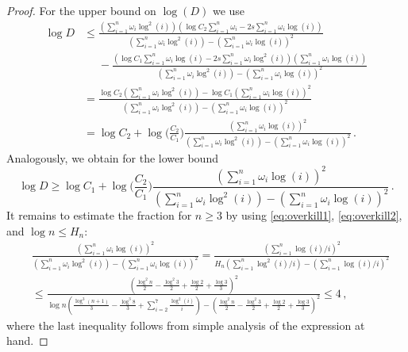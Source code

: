 \documentclass[10pt,a4paper]{amsart}
\begin{document}
\begin{proof}
    For the upper bound on $\log(D)$ we use
    \begin{align*}
        \log D
        &\le \frac{(\sum_{i=1}^{n}\omega_i \log^2 (i))(\log C_2 \sum_{i=1}^{n}\omega_i-2s\sum_{i=1}^{n}\omega_i\log (i))}{(\sum_{i=1}^{n}\omega_i\log^2 (i))-(\sum_{i=1}^{n}\omega_i \log (i))^2} \\
        &\phantom\le - \frac{(\log C_1\sum_{i=1}^{n}\omega_i\log (i) - 2s\sum_{i=1}^{n}\omega_i\log^2 (i))(\sum_{i=1}^{n}\omega_i\log (i))}{(\sum_{i=1}^{n}\omega_i\log^2 (i))-(\sum_{i=1}^{n}\omega_i \log (i))^2} \\
        &= \frac{\log C_2 (\sum_{i=1}^{n}\omega_i\log^2 (i)) - \log C_1 (\sum_{i=1}^{n}\omega_i\log (i))^2}{(\sum_{i=1}^{n}\omega_i\log^2 (i))-(\sum_{i=1}^{n}\omega_i \log (i))^2} \\
        &= \log C_2 + \log\Big(\frac{C_2}{C_1}\Big) \frac{(\sum_{i=1}^{n}\omega_i \log (i))^2}{(\sum_{i=1}^{n}\omega_i\log^2 (i))-(\sum_{i=1}^{n}\omega_i \log (i))^2} \,.
    \end{align*}
    Analogously, we obtain for the lower bound
    \begin{equation*}
        \log D
        \ge
        \log C_1 + \log\Big(\frac{C_2}{C_1}\Big) \frac{(\sum_{i=1}^{n}\omega_i \log (i))^2}{(\sum_{i=1}^{n}\omega_i\log^2 (i))-(\sum_{i=1}^{n}\omega_i \log (i))^2} \,.
    \end{equation*}
    It remains to estimate the fraction for $n\ge 3$ by using \eqref{eq:overkill1}, \eqref{eq:overkill2}, and $\log n\le H_n$:
    \begin{align*}
        &\frac{(\sum_{i=1}^{n}\omega_i \log(i))^2}{(\sum_{i=1}^{n}\omega_i \log^2(i)) - (\sum_{i=1}^{n}\omega_i \log(i))^2}
        = \frac{(\sum_{i=1}^{n}\log(i)/i)^2}{H_n(\sum_{i=1}^{n} \log^2(i)/i) - (\sum_{i=1}^{n} \log(i)/i)^2} \\
        &\le \frac{(\frac{\log^2 n}{2} - \frac{\log^2 3}{2} + \frac{\log 2}{2} + \frac{\log 3}{3})^2}{\log n(\frac{\log^3 (n+1)}{3} - \frac{\log^3 8}{3} + \sum_{i=2}^{7}\frac{\log^2 (i)}{i}) - (\frac{\log^2 n}{2} - \frac{\log^2 3}{2} + \frac{\log 2}{2} + \frac{\log 3}{3})^2} 
        \le 4 \,,
    \end{align*}
    where the last inequality follows from simple analysis of the expression at hand.
\end{proof} 
\end{document}
